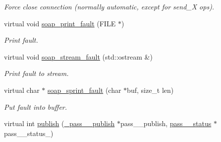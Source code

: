 \begin{DoxyCompactItemize}
\begin{DoxyCompactList}\small\item\em Force close connection (normally automatic, except for send\_\-X ops). \item\end{DoxyCompactList}\item 
\hypertarget{classPASSSubscriberPortBindingProxy_a6d2c92c359792de65cd549ca43c36d69}{
virtual void \hyperlink{classPASSSubscriberPortBindingProxy_a6d2c92c359792de65cd549ca43c36d69}{soap\_\-print\_\-fault} (FILE $\ast$)}
\label{classPASSSubscriberPortBindingProxy_a6d2c92c359792de65cd549ca43c36d69}

\begin{DoxyCompactList}\small\item\em Print fault. \item\end{DoxyCompactList}\item 
\hypertarget{classPASSSubscriberPortBindingProxy_aecdcd80d299c494d7bb4ef7ef702801b}{
virtual void \hyperlink{classPASSSubscriberPortBindingProxy_aecdcd80d299c494d7bb4ef7ef702801b}{soap\_\-stream\_\-fault} (std::ostream \&)}
\label{classPASSSubscriberPortBindingProxy_aecdcd80d299c494d7bb4ef7ef702801b}

\begin{DoxyCompactList}\small\item\em Print fault to stream. \item\end{DoxyCompactList}\item 
\hypertarget{classPASSSubscriberPortBindingProxy_a15a3d321e0b5993d57a5e4098a6097f7}{
virtual char $\ast$ \hyperlink{classPASSSubscriberPortBindingProxy_a15a3d321e0b5993d57a5e4098a6097f7}{soap\_\-sprint\_\-fault} (char $\ast$buf, size\_\-t len)}
\label{classPASSSubscriberPortBindingProxy_a15a3d321e0b5993d57a5e4098a6097f7}

\begin{DoxyCompactList}\small\item\em Put fault into buffer. \item\end{DoxyCompactList}\item 
\hypertarget{classPASSSubscriberPortBindingProxy_ac2e0a75cc0293368a2d44cd5f65d44eb}{
virtual int \hyperlink{classPASSSubscriberPortBindingProxy_ac2e0a75cc0293368a2d44cd5f65d44eb}{publish} (\hyperlink{class__pass____publish}{\_\-pass\_\-\_\-publish} $\ast$pass\_\-\_\-publish, \hyperlink{classpass____status}{pass\_\-\_\-status} $\ast$pass\_\-\_\-status\_\-)}
\label{classPASSSubscriberPortBindingProxy_ac2e0a75cc0293368a2d44cd5f65d44eb}


\end{DoxyCompactItemize}
